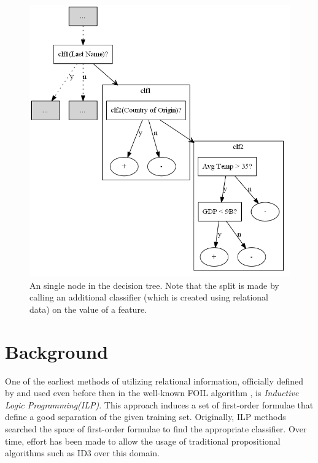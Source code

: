 \documentclass[12pt, a4paper]{article}
\theoremstyle{definition}
\begin{document}
\begin{figure}[H]
    \centering
    \includegraphics[scale=0.3, keepaspectratio=true]{output.png}
    \caption{An single node in the decision tree. Note that the split is made by calling an additional classifier (which is created using relational data) on the value of a feature.}
    \label{fig:example}
\end{figure}


\section{Background} \label{background}

One of the earliest methods of utilizing relational information, officially defined by \citet{muggleton1991inductive} and used even before then in the well-known FOIL algorithm \citep{quinlan1990learning}, is \emph{Inductive Logic Programming(ILP)}. This approach induces a set of first-order formulae
that define a good separation of the given training set. Originally, ILP methods searched the space of first-order formulae to find the appropriate classifier.
Over time, effort has been made to allow the usage of traditional propositional algorithms such as ID3 \citep{quinlan1986} over this domain.
\end{document}
